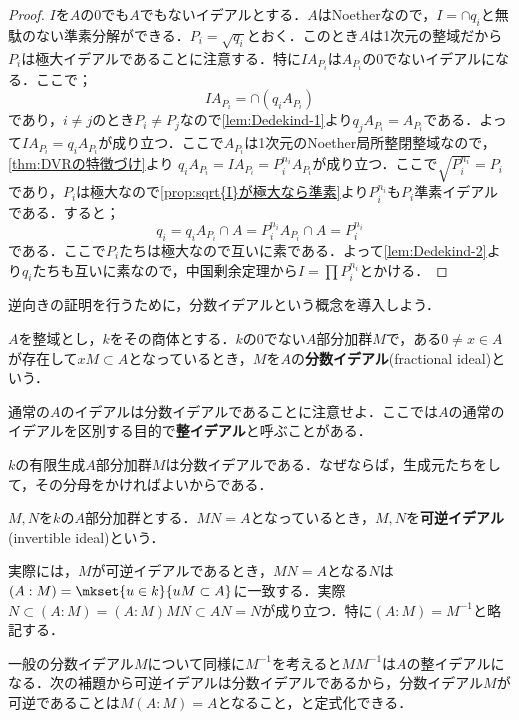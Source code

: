 \begin{proof}
	$I$を$A$の0でも$A$でもないイデアルとする．$A$はNoetherなので，$I=\cap q_i$と無駄のない準素分解ができる．$P_i=\sqrt{q_i}$とおく．このとき$A$は1次元の整域だから$P_i$は極大イデアルであることに注意する．特に$IA_{P_i}$は$A_{P_i}$の0でないイデアルになる．ここで；
	\[IA_{P_i}=\cap (q_iA_{P_i})\]
	であり，$i\neq j$のとき$P_i\neq P_j$なので\ref{lem:Dedekind-1}より$q_jA_{P_i}=A_{P_i}$である．よって$IA_{P_i}=q_iA_{P_i}$が成り立つ．ここで$A_{P_i}$は1次元のNoether局所整閉整域なので，\ref{thm:DVRの特徴づけ}より $q_iA_{P_i}=IA_{P_i}=P_i^{n_i}A_{P_i}$が成り立つ．ここで$\sqrt{P_i^{n_i}}=P_i$であり，$P_i$は極大なので\ref{prop:sqrt{I}が極大なら準素}より$P_i^{n_i}$も$P_i$準素イデアルである．すると；
	\[q_i=q_iA_{P_i}\cap A=P_i^{n_i}A_{P_i}\cap A=P_i^{n_i}\]
	である．ここで$P_i$たちは極大なので互いに素である．よって\ref{lem:Dedekind-2}より$q_i$たちも互いに素なので，中国剰余定理から$I=\prod P_i^{n_i}$とかける．
\end{proof}

逆向きの証明を行うために，分数イデアルという概念を導入しよう．

\begin{defi}[分数イデアル]
	$A$を整域とし，$k$をその商体とする．$k$の0でない$A$部分加群$M$で，ある$0\neq x\in A$が存在して$xM\subset A$となっているとき，$M$を$A$の\textbf{分数イデアル}(fractional ideal)という．
\end{defi}

通常の$A$のイデアルは分数イデアルであることに注意せよ．ここでは$A$の通常のイデアルを区別する目的で\textbf{整イデアル}と呼ぶことがある．

$k$の有限生成$A$部分加群$M$は分数イデアルである．なぜならば，生成元たちをして，その分母をかければよいからである．

\begin{defi}[可逆イデアル]
	$M,N$を$k$の$A$部分加群とする．$MN=A$となっているとき，$M,N$を\textbf{可逆イデアル}(invertible ideal)という．
\end{defi}
	実際には，$M$が可逆イデアルであるとき，$MN=A$となる$N$は$(A:M)=\mkset{u\in k}{uM\subset A}$に一致する．実際$N\subset (A:M)=(A:M)MN\subset AN=N$が成り立つ．特に$(A:M)=M^{-1}$と略記する．
	
	一般の分数イデアル$M$について同様に$M^{-1}$を考えると$MM^{-1}$は$A$の整イデアルになる．次の補題から可逆イデアルは分数イデアルであるから，分数イデアル$M$が可逆であることは$M(A:M)=A$となること，と定式化できる．

